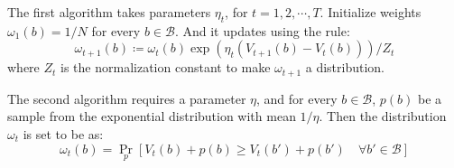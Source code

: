 \documentclass[letterpaper]{article}
\begin{document}
\begin{spacing}{1.1}
The first algorithm takes parameters $\eta_t$, for $t = 1,2,\cdots,T$. Initialize weights $\omega_1(b) = 1/N$ for every $b \in \mathcal{B}$. And it updates using the rule:
$$
\omega_{t+1}(b) \coloneqq \omega_t(b)\exp{(\eta_t(V_{t+1}(b)-V_t(b)))/Z_t}
$$
where $Z_t$ is the normalization constant to make $\omega_{t+1}$ a distribution.

The second algorithm requires a parameter $\eta$, and for every $b \in \mathcal{B}$, $p(b)$ be a sample from the exponential distribution with mean $1/\eta$. Then the distribution $\omega_t$ is set to be as:
$$
\omega_t(b) = \Pr_p [V_t(b) + p(b) \ge V_t(b') + p(b')\quad\forall b' \in \mathcal{B}]
$$
\end{spacing}
\end{document}
